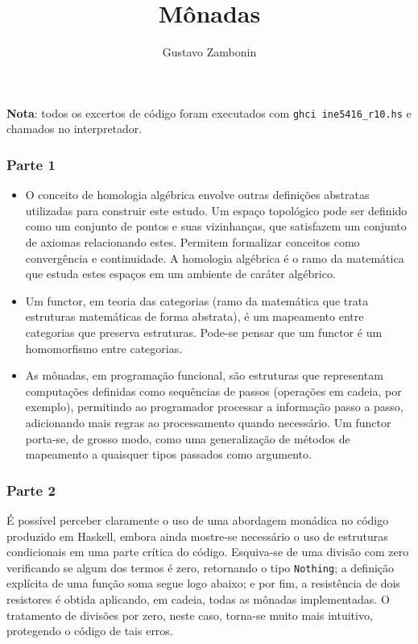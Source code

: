 \documentclass{../sftex/sftex}
\title{Mônadas}
\author{Gustavo Zambonin}
\begin{document}
\maketitle

\textbf{Nota}: todos os excertos de código foram executados com
\verb!ghci ine5416_r10.hs! e chamados no interpretador.

\subsubsection*{Parte 1}
\begin{itemize}
    \item O conceito de homologia algébrica envolve outras definições abstratas
    utilizadas para construir este estudo. Um espaço topológico pode ser
    definido como um conjunto de pontos e suas vizinhanças, que satisfazem um
    conjunto de axiomas relacionando estes. Permitem formalizar conceitos como
    convergência e continuidade. A homologia algébrica é o ramo da matemática
    que estuda estes espaços em um ambiente de caráter algébrico.

    \item Um functor, em teoria das categorias (ramo da matemática que trata
    estruturas matemáticas de forma abstrata), é um mapeamento entre
    categorias que preserva estruturas. Pode-se pensar que um functor é um
    homomorfismo entre categorias.

    \item As mônadas, em programação funcional, são estruturas que representam
    computações definidas como sequências de passos (operações em cadeia, por
    exemplo), permitindo ao programador processar a informação passo a passo,
    adicionando mais regras ao processamento quando necessário. Um functor
    porta-se, de grosso modo, como uma generalização de métodos de mapeamento
    a quaisquer tipos passados como argumento.
\end{itemize}

\subsubsection*{Parte 2}

É possível perceber claramente o uso de uma abordagem monádica no código
produzido em Haskell, embora ainda mostre-se necessário o uso de estruturas
condicionais em uma parte crítica do código. Esquiva-se de uma divisão com zero
verificando se algum dos termos é zero, retornando o tipo \verb!Nothing!; a
definição explícita de uma função soma segue logo abaixo; e por fim, a
resistência de dois resistores é obtida aplicando, em cadeia, todas as mônadas
implementadas. O tratamento de divisões por zero, neste caso, torna-se muito
mais intuitivo, protegendo o código de tais erros.
\end{document}
